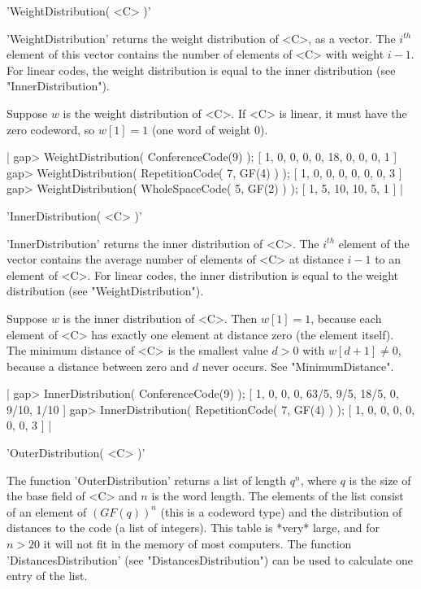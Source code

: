 'WeightDistribution( <C> )'

'WeightDistribution'  returns   the weight distribution    of  <C>, as  a
vector. The    $i^{th}$ element of  this  vector  contains the  number of
elements of  <C>   with  weight $i-1$.  For   linear  codes, the   weight
distribution  is     equal    to     the    inner    distribution    (see
"InnerDistribution").

Suppose $w$ is the weight distribution of <C>. If <C>  is linear, it must
have the zero codeword, so $w[1] = 1$ (one word of weight 0).

|    gap> WeightDistribution( ConferenceCode(9) );
    [ 1, 0, 0, 0, 0, 18, 0, 0, 0, 1 ]
    gap> WeightDistribution( RepetitionCode( 7, GF(4) ) );
    [ 1, 0, 0, 0, 0, 0, 0, 3 ]
    gap> WeightDistribution( WholeSpaceCode( 5, GF(2) ) );
    [ 1, 5, 10, 10, 5, 1 ] |


'InnerDistribution( <C> )'

'InnerDistribution'  returns the inner distribution  of <C>. The $i^{th}$
element of the vector contains the  average number of  elements of <C> at
distance   $i-1$ to  an element   of <C>.  For  linear  codes, the  inner
distribution    is   equal    to     the  weight    distribution     (see
"WeightDistribution").

Suppose  $w$ is the inner distribution  of <C>. Then  $w[1] = 1$, because
each element of <C> has exactly one element at distance zero (the element
itself). The minimum distance of  <C> is the smallest  value $d > 0$ with
$w[d+1]  \neq  0$, because  a    distance between  zero  and  $d$   never
occurs. See "MinimumDistance".

|    gap> InnerDistribution( ConferenceCode(9) );
    [ 1, 0, 0, 0, 63/5, 9/5, 18/5, 0, 9/10, 1/10 ]
    gap> InnerDistribution( RepetitionCode( 7, GF(4) ) );
    [ 1, 0, 0, 0, 0, 0, 0, 3 ] |


'OuterDistribution( <C> )'

The function  'OuterDistribution' returns a  list of  length $q^n$, where
$q$ is the size of the base field of <C> and $n$  is the word length. The
elements of  the list  consist of  an element of  $(GF(q))^n$ (this  is a
codeword type)  and the distribution of distances  to the code (a list of
integers).  This table is *very* large, and for $n >  20$ it will not fit
in the memory   of most computers.  The function  'DistancesDistribution'
(see "DistancesDistribution") can be used  to calculate one entry of  the
list.

